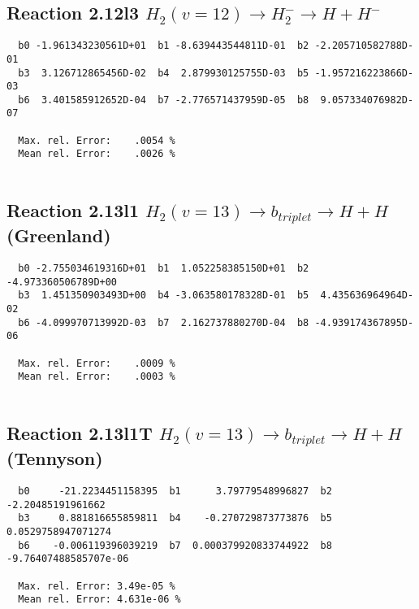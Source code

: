 \documentclass[12pt]{article}
\begin{document}
\subsection{
Reaction 2.12l3
 $ H_2(v=12) \rightarrow H_2^- \rightarrow H + H^-$
}


\begin{small}\begin{verbatim}
  b0 -1.961343230561D+01  b1 -8.639443544811D-01  b2 -2.205710582788D-01
  b3  3.126712865456D-02  b4  2.879930125755D-03  b5 -1.957216223866D-03
  b6  3.401585912652D-04  b7 -2.776571437959D-05  b8  9.057334076982D-07

  Max. rel. Error:    .0054 %
  Mean rel. Error:    .0026 %


\end{verbatim}\end{small}


\newpage
\subsection{
Reaction 2.13l1
$ H_2(v=13) \rightarrow b_{triplet}\rightarrow H + H $ (Greenland) 
}


\begin{small}\begin{verbatim}
  b0 -2.755034619316D+01  b1  1.052258385150D+01  b2 -4.973360506789D+00
  b3  1.451350903493D+00  b4 -3.063580178328D-01  b5  4.435636964964D-02
  b6 -4.099970713992D-03  b7  2.162737880270D-04  b8 -4.939174367895D-06

  Max. rel. Error:    .0009 %
  Mean rel. Error:    .0003 %


\end{verbatim}\end{small}


\subsection{
Reaction 2.13l1T
$  H_2(v=13) \rightarrow b_{triplet}\rightarrow H + H $ (Tennyson)
}


\begin{small}\begin{verbatim}
  b0     -21.2234451158395  b1      3.79779548996827  b2     -2.20485191961662
  b3     0.881816655859811  b4    -0.270729873773876  b5    0.0529758947071274
  b6    -0.006119396039219  b7  0.000379920833744922  b8 -9.76407488585707e-06

  Max. rel. Error: 3.49e-05 %
  Mean rel. Error: 4.631e-06 %
\end{verbatim}\end{small}
\end{document}
